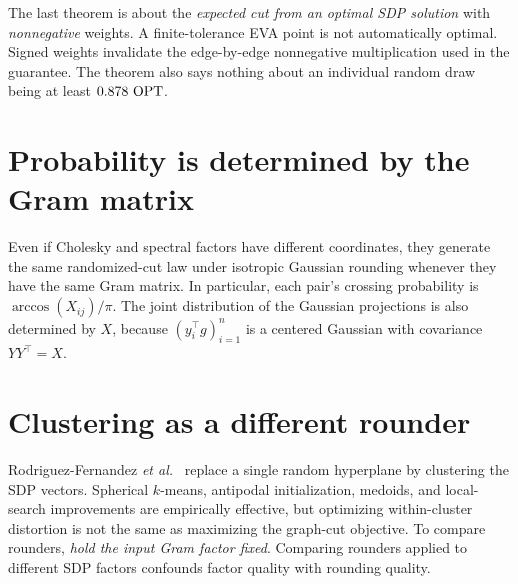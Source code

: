 \begin{caution}
The last theorem is about the \emph{expected cut from an optimal SDP solution} with \emph{nonnegative} weights. A finite-tolerance EVA point is not automatically optimal. Signed weights invalidate the edge-by-edge nonnegative multiplication used in the guarantee. The theorem also says nothing about an individual random draw being at least $0.878\,\operatorname{OPT}$.
\end{caution}

\section{Probability is determined by the Gram matrix}
Even if Cholesky and spectral factors have different coordinates, they generate the same randomized-cut law under isotropic Gaussian rounding whenever they have the same Gram matrix. In particular, each pair's crossing probability is $\arccos(X_{ij})/\pi$. The joint distribution of the Gaussian projections is also determined by $X$, because $(y_i^\top g)_{i=1}^n$ is a centered Gaussian with covariance $YY^\top=X$.

\section{Clustering as a different rounder}
Rodriguez-Fernandez \emph{et al.}~\cite{rodriguez2020} replace a single random hyperplane by clustering the SDP vectors. Spherical $k$-means, antipodal initialization, medoids, and local-search improvements are empirically effective, but optimizing within-cluster distortion is not the same as maximizing the graph-cut objective. To compare rounders, \emph{hold the input Gram factor fixed}. Comparing rounders applied to different SDP factors confounds factor quality with rounding quality.
